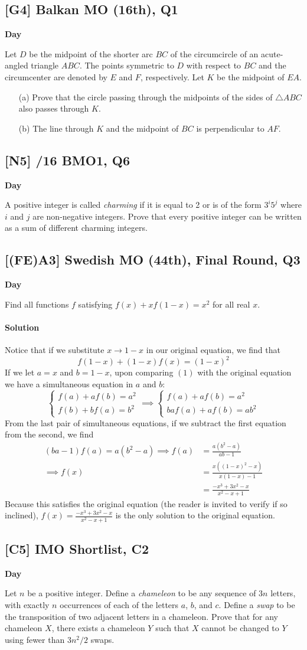 \documentclass[10pt]{article}
\newcommand{\themonth}{March}
\newcommand{\theyear}{2019}
\newcounter{day}
\newcounter{solution}
\newcounter{datenumber}
\newcommand{\problem}[4][0]{
	\newpage
	\subsection{[#3] \space #2} \hfill 
	{\large\textbf{Day \arabic{day}}} %
	\begin{flushleft} #4 \end{flushleft}
	\vspace{1em}
	\addtocounter{day}{1}
	\addtocounter{datenumber}{1}
	\setcounter{solution}{1}
}
\newcommand{\anonsolution}[2][0]{
	\paragraph{Solution \arabic{solution}} 
	\begin{flushleft} #2 \end{flushleft}
	\addtocounter{solution}{1}
	\vspace{1em}
}
\begin{document}
\problem[17]{1999 Balkan MO (16th), Q1}{G4}{Let $D$ be the midpoint of the shorter arc $BC$ of the circumcircle of an acute-angled triangle $ABC$. The points symmetric to $D$ with respect to $BC$ and the circumcenter are denoted by $E$ and $F$, respectively. Let $K$ be the midpoint of $EA$. \begin{enumerate} \item[(a)] Prove that the circle passing through the midpoints of the sides of $\triangle ABC$ also passes through $K$. \item[(b)] The line through $K$ and the midpoint of $BC$ is perpendicular to $AF$. \end{enumerate}}

\problem[18]{2015/16 BMO1, Q6}{N5}{A positive integer is called \emph{charming} if it is equal to 2 or is of the form $3^i5^j$ where $i$ and $j$ are non-negative integers. Prove that every positive integer can be written as a sum of different charming integers.}

\problem[19]{2004 Swedish MO (44th), Final Round, Q3}{(FE)A3}{Find all functions $f$ satisfying $f(x)+x f(1-x) = x^2$ for all real $x$.}

\anonsolution[19]{Notice that if we substitute \(x\to 1-x\) in our original equation, we find that \[f(1-x)+(1-x)f(x)=(1-x)^2\tag{1}\] If we let \(a=x\) and \(b=1-x\), upon comparing \((1)\) with the original equation we have a simultaneous equation in \(a\) and \(b\): \[\begin{cases} f(a)+af(b)=a^2 \\ f(b)+bf(a)=b^2 \end{cases} \implies \begin{cases} f(a)+af(b)=a^2  \\ baf(a)+af(b)=ab^2  \end{cases} \]From the last pair of simultaneous equations, if we subtract the first equation from the second, we find \begin{align*} (ba-1)f(a)=a(b^2-a) \implies f(a)& =\frac{a(b^2-a)}{ab-1} \\ \implies f(x) &= \frac{x((1-x)^2-x)}{x(1-x)-1} \\ &= \frac{-x^3+3x^2-x}{x^2-x+1} 	 \end{align*} Because this satisfies the original equation (the reader is invited to verify if so inclined), \(f(x)=\frac{-x^3+3x^2-x}{x^2-x+1}\) is the only solution to the original equation.}

\problem[20]{2018 IMO Shortlist, C2}{C5}{Let $n$ be a positive integer. Define a \emph{chameleon} to be any sequence of $3n$ letters, with exactly $n$ occurrences of each of the letters $a$, $b$, and $c$. Define a \emph{swap} to be the transposition of two adjacent letters in a chameleon. Prove that for any chameleon $X$, there exists a chameleon $Y$ such that $X$ cannot be changed to $Y$ using fewer than $3n^2/2$ swaps.}
\end{document}
